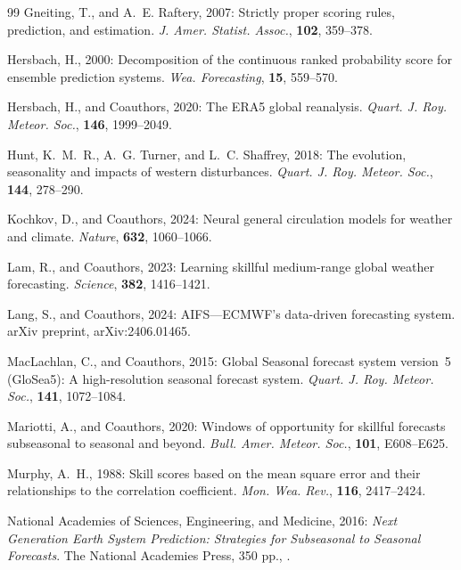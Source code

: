 \begin{thebibliography}{99}
Gneiting, T., and A.~E. Raftery, 2007: Strictly proper scoring rules,
prediction, and estimation. \textit{J. Amer. Statist. Assoc.},
\textbf{102}, 359--378.

Hersbach, H., 2000: Decomposition of the continuous ranked probability
score for ensemble prediction systems. \textit{Wea. Forecasting},
\textbf{15}, 559--570.

Hersbach, H., and Coauthors, 2020: The ERA5 global reanalysis.
\textit{Quart. J. Roy. Meteor. Soc.}, \textbf{146}, 1999--2049.

Hunt, K.~M.~R., A.~G. Turner, and L.~C. Shaffrey, 2018: The evolution,
seasonality and impacts of western disturbances. \textit{Quart. J.
Roy. Meteor. Soc.}, \textbf{144}, 278--290.

Kochkov, D., and Coauthors, 2024: Neural general circulation models
for weather and climate. \textit{Nature}, \textbf{632}, 1060--1066.

Lam, R., and Coauthors, 2023: Learning skillful medium-range global
weather forecasting. \textit{Science}, \textbf{382}, 1416--1421.

Lang, S., and Coauthors, 2024: AIFS---ECMWF's data-driven forecasting
system. arXiv preprint, arXiv:2406.01465.

MacLachlan, C., and Coauthors, 2015: Global Seasonal forecast system
version~5 (GloSea5): A high-resolution seasonal forecast system.
\textit{Quart. J. Roy. Meteor. Soc.}, \textbf{141}, 1072--1084.

Mariotti, A., and Coauthors, 2020: Windows of opportunity for skillful
forecasts subseasonal to seasonal and beyond. \textit{Bull. Amer.
Meteor. Soc.}, \textbf{101}, E608--E625.

Murphy, A.~H., 1988: Skill scores based on the mean square error and
their relationships to the correlation coefficient. \textit{Mon. Wea.
Rev.}, \textbf{116}, 2417--2424.

National Academies of Sciences, Engineering, and Medicine, 2016:
\textit{Next Generation Earth System Prediction: Strategies for
Subseasonal to Seasonal Forecasts}. The National Academies Press,
350 pp., .


\end{thebibliography}
